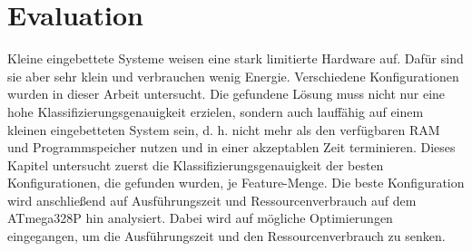\chapter{Evaluation}
Kleine eingebettete Systeme weisen eine stark limitierte Hardware auf. Dafür sind sie aber sehr klein und verbrauchen wenig Energie. Verschiedene Konfigurationen wurden in dieser Arbeit untersucht. Die gefundene
Lösung muss nicht nur eine hohe Klassifizierungsgenauigkeit erzielen, sondern auch lauffähig auf einem kleinen eingebetteten System sein, d. h. nicht mehr als den verfügbaren RAM und Programmspeicher nutzen und in
einer akzeptablen Zeit terminieren.
\newline
\newline
Dieses Kapitel untersucht zuerst die Klassifizierungsgenauigkeit der besten Konfigurationen, die gefunden wurden, je Feature-Menge. Die beste Konfiguration wird anschließend auf Ausführungszeit
und Ressourcenverbrauch auf dem ATmega328P hin analysiert. Dabei wird auf mögliche Optimierungen eingegangen, um die Ausführungszeit und den Ressourcenverbrauch zu senken.



